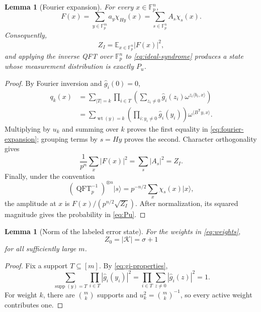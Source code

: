 \documentclass[11pt,letterpaper]{article}
\newtheorem{lemma}[theorem]{Lemma}
\theoremstyle{definition}
\newcommand{\F}{\mathbb{F}}
\newcommand{\Kcal}{\mathcal{K}}
\newcommand{\supp}{\operatorname{supp}}
\newcommand{\wt}{\operatorname{wt}}
\newcommand{\E}{\mathbb{E}}
\newcommand{\ket}[1]{\lvert #1\rangle}
\newcommand{\abs}[1]{\left\lvert #1\right\rvert}
\newcommand{\QFT}{\operatorname{QFT}}
\begin{document}
\begin{lemma}[Fourier expansion]
\label{lem:fourier-expansion}
For every $x\in\F_p^n$,
\begin{equation}
   F(x)=\sum_{y\in\F_p^m}a_y\chi_{Hy}(x)
       =\sum_{s\in\F_p^n}A_s\chi_s(x).
   \label{eq:fourier-expansion}
\end{equation}
Consequently,
\begin{equation}
   Z_I=\E_{x\in\F_p^n}\abs{F(x)}^2,
   \label{eq:ZI-parseval}
\end{equation}
and applying the inverse QFT over $\F_p^n$ to \cref{eq:ideal-syndrome} produces a state whose measurement distribution is exactly $P_u$.
\end{lemma}

\begin{proof}
By Fourier inversion and $\widehat g_i(0)=0$,
\begin{align*}
   q_k(x)
   &=\sum_{\abs{T}=k}\prod_{i\in T}
       \left(\sum_{z_i\ne0}\widehat g_i(z_i)
       \omega^{z_i\langle b_i,x\rangle}\right)\\
   &=\sum_{\wt(y)=k}
       \left(\prod_{i:y_i\ne0}\widehat g_i(y_i)\right)
       \omega^{\langle B^{\mathsf T}y,x\rangle}.
\end{align*}
Multiplying by $u_k$ and summing over $k$ proves the first equality in \cref{eq:fourier-expansion}; grouping terms by $s=Hy$ proves the second.  Character orthogonality gives
\[
   \frac1{p^n}\sum_x\abs{F(x)}^2
   =\sum_s\abs{A_s}^2=Z_I.
\]
Finally, under the convention
\[
   (\QFT_p^{-1})^{\otimes n}\ket{s}
      =p^{-n/2}\sum_x\chi_s(x)\ket{x},
\]
the amplitude at $x$ is $F(x)/(p^{n/2}\sqrt{Z_I})$.  After normalization, its squared magnitude gives the probability in \cref{eq:Pu}.
\end{proof}

\begin{lemma}[Norm of the labeled error state]
\label{lem:Z0}
For the weights in \cref{eq:weights},
\begin{equation}
   Z_0=\abs{\Kcal}=\sigma+1
\end{equation}
for all sufficiently large $m$.
\end{lemma}

\begin{proof}
Fix a support $T\subseteq[m]$.  By \cref{eq:gi-properties},
\[
   \sum_{\supp(y)=T}
      \prod_{i\in T}\abs{\widehat g_i(y_i)}^2
   =\prod_{i\in T}\sum_{z\ne0}\abs{\widehat g_i(z)}^2=1.
\]
For weight $k$, there are $\binom mk$ supports and $u_k^2=\binom mk^{-1}$, so every active weight contributes one.
\end{proof}
\end{document}
